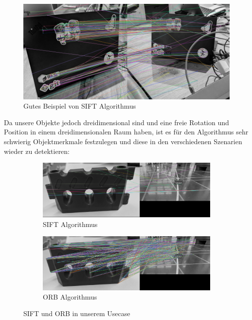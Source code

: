 \begin{figure}[H]
    \centering
    \includegraphics[width=1\linewidth]{assets/informatik-prototyp/opencv/sift/sift_good_example.png}
    \caption{Gutes Beispiel von SIFT Algorithmus}
    \label{fig:good-sift-example}
\end{figure}

Da unsere Objekte jedoch dreidimensional sind und eine freie Rotation und Position in einem dreidimensionalen Raum haben, ist es für den Algorithmus sehr schwierig Objektmerkmale festzulegen und diese in den verschiedenen Szenarien wieder zu detektieren:

\begin{figure}[H]
    \centering
\begin{subfigure}{1\textwidth}
    \includegraphics[width=1\linewidth]{assets/informatik-prototyp/opencv/sift/sift_our_usecase_example.png}
    \caption{SIFT Algorithmus}
    \label{fig:bad-sift-example}
\end{subfigure}
\begin{subfigure}{1\textwidth}
    \includegraphics[width=1\linewidth]{assets/informatik-prototyp/opencv/sift/orb_our_usecase_example.png}
    \caption{ORB Algorithmus}
    \label{fig:bad-orb-example}
\end{subfigure}
    \caption{SIFT und ORB in unserem Usecase}
    \label{fig:sift-orb-in-our-usecase}
\end{figure}


